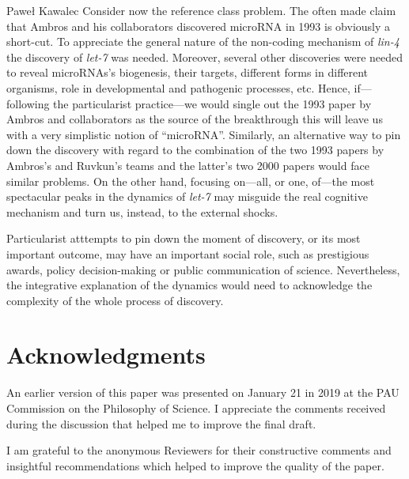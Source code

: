 \begin{artengenv}{Paweł Kawalec}
Consider now the reference class problem. The often made claim that Ambros and his collaborators discovered microRNA in 1993 is obviously a short-cut. To appreciate the general nature of the non-coding mechanism of \textit{lin-4} the discovery of \textit{let-7} was needed. Moreover, several other discoveries were needed to reveal microRNAs's biogenesis, their targets, different forms in different organisms, role in developmental and pathogenic processes, etc. Hence, if---following the particularist practice---we would single out the 1993 paper by Ambros and collaborators as the source of the breakthrough this will leave us with a very simplistic notion of ``microRNA''. Similarly, an alternative way to pin down the discovery with regard to the combination of the two 1993 papers by Ambros's and Ruvkun's teams and the latter's two 2000 papers would face similar problems. On the other hand, focusing on---all, or one, of---the most spectacular peaks in the dynamics of \textit{let-7} may misguide the real cognitive mechanism and turn us, instead, to the external shocks.

Particularist atttempts to pin down the moment of discovery, or its most important outcome, may have an important social role, such as prestigious awards, policy decision-making or public communication of science. Nevertheless, the integrative explanation of the dynamics would need to acknowledge the complexity of the whole process of discovery.

\section{Acknowledgments }
An earlier version of this paper was presented on January 21 in 2019 at the PAU Commission on the Philosophy of Science. I appreciate the comments received during the discussion that helped me to improve the final draft.

I am grateful to the anonymous Reviewers for their constructive comments and insightful recommendations which helped to improve the quality of the paper.

\end{artengenv}